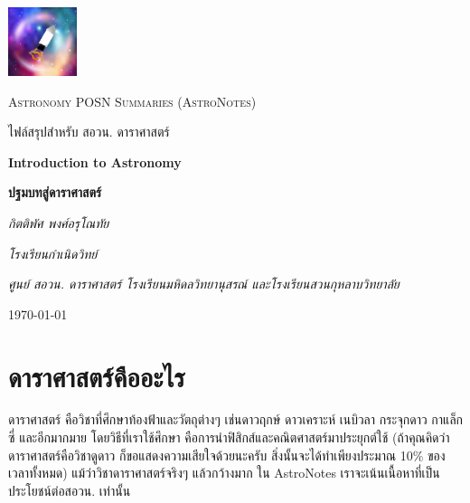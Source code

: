 \documentclass[12pt, a4paper, oneside]{article}
\begin{document}
\pagestyle{fancy}
\fancyhf{}
\cfoot{\thepage}

\begin{titlepage}
    \centering
    
    \includegraphics[width=0.15\textwidth]{img/mzpfp2.jpg}
    \par\vspace{1cm}
	{\Large \textsc{Astronomy POSN Summaries (AstroNotes)}\par}
    \vspace{0.25cm}
	{\Large \textsc{ไฟล์สรุปสำหรับ สอวน. ดาราศาสตร์}\par}

	\vspace{2cm}
	{\LARGE\bfseries Introduction to Astronomy\par}
    \vspace{0.25cm}
    {\LARGE\bfseries ปฐมบทสู่ดาราศาสตร์\par}

	\vspace{1cm}
	{\Large\itshape กิตติพัศ พงศ์อรุโณทัย\par}
    \vspace{0.25cm}
    {\large\itshape โรงเรียนกำเนิดวิทย์\par}
    {\itshape ศูนย์ สอวน. ดาราศาสตร์ โรงเรียนมหิดลวิทยานุสรณ์ และโรงเรียนสวนกุหลาบวิทยาลัย}
	\vfill
	{\large \today\par}
\end{titlepage}

\section{ดาราศาสตร์คืออะไร}
ดาราศาสตร์ คือวิชาที่ศึกษาท้องฟ้าและวัตถุต่างๆ เช่นดาวฤกษ์ ดาวเคราะห์ เนบิวลา กระจุกดาว กาแล็กซี่ และอีกมากมาย โดยวิธีที่เราใช้ศึกษา คือการนำฟิสิกส์และคณิตศาสตร์มาประยุกต์ใช้ (ถ้าคุณคิดว่าดาราศาสตร์คือวิชาดูดาว ก็ขอแสดงความเสียใจด้วยนะครับ สิ่งนั้นจะได้ทำเพียงประมาณ 10\% ของเวลาทั้งหมด) แม้ว่าวิชาดาราศาสตร์จริงๆ แล้วกว้างมาก ใน AstroNotes เราจะเน้นเนื้อหาที่เป็นประโยชน์ต่อสอวน. เท่านั้น
\end{document}
